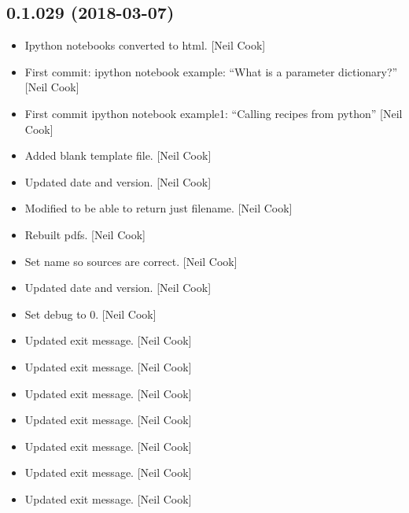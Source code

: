 \documentclass[a4paper,10pt,english]{report}
\begin{document}
\subsection{0.1.029 (2018-03-07)}
\label{\detokenize{misc/changelog:id475}}\begin{itemize}
\item {} 
Ipython notebooks converted to html. {[}Neil Cook{]}

\item {} 
First commit: ipython notebook example: “What is a parameter
dictionary?” {[}Neil Cook{]}

\item {} 
First commit ipython notebook example1: “Calling recipes from python”
{[}Neil Cook{]}

\item {} 
Added blank template file. {[}Neil Cook{]}

\item {} 
Updated date and version. {[}Neil Cook{]}

\item {} 
Modified  to be able to return just filename. {[}Neil
Cook{]}

\item {} 
Rebuilt pdfs. {[}Neil Cook{]}

\item {} 
Set  name so sources are correct. {[}Neil Cook{]}

\item {} 
Updated date and version. {[}Neil Cook{]}

\item {} 
Set debug to 0. {[}Neil Cook{]}

\item {} 
Updated exit message. {[}Neil Cook{]}

\item {} 
Updated exit message. {[}Neil Cook{]}

\item {} 
Updated exit message. {[}Neil Cook{]}

\item {} 
Updated exit message. {[}Neil Cook{]}

\item {} 
Updated exit message. {[}Neil Cook{]}

\item {} 
Updated exit message. {[}Neil Cook{]}

\item {} 
Updated exit message. {[}Neil Cook{]}


\end{itemize}
\end{document}
